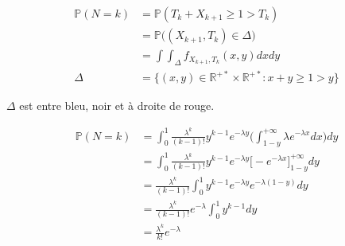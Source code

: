\documentclass{article}
\begin{document}
\begin{align*}
  \mathbb{P}(N=k) &= \mathbb{P}(T_k + X_{k+1} \geq 1 > T_k) \\
  &= \mathbb{P}\big( (X_{k+1}, T_k) \in \Delta \big) \\
  &= \int \int_{\Delta}f_{X_{k+1},T_k}(x,y)dxdy \\
  \Delta &= \big\{ (x,y) \in \mathbb{R}^{+*} \times \mathbb{R}^{+*}: x+y \geq 1 > y \big\}
\end{align*}


$\Delta$ est entre bleu, noir et à droite de rouge.

\begin{align*}
  \mathbb{P}(N=k) &= \int_0^1 \frac{\lambda^k}{(k-1)!} y^{k-1} e^{- \lambda y} \Big( \int_{1-y}^{+ \infty} \lambda e^{- \lambda x} dx \Big) dy \\
  &= \int_0^1 \frac{\lambda^k}{(k-1)!} y^{k-1} e^{- \lambda y} \Big[ -e^{-\lambda x} \Big]_ {1-y}^{+ \infty} dy \\
  &= \frac{\lambda ^k}{(k-1)!} \int_0^1 y^{k-1} e^{- \lambda y} e^{- \lambda (1-y)} dy \\
  &= \frac{\lambda^k}{(k-1)!} e^{- \lambda} \int_0^1 y^{k-1} dy \\
  &= \frac{\lambda^k}{k!} e^{- \lambda}
\end{align*}
\end{document}
